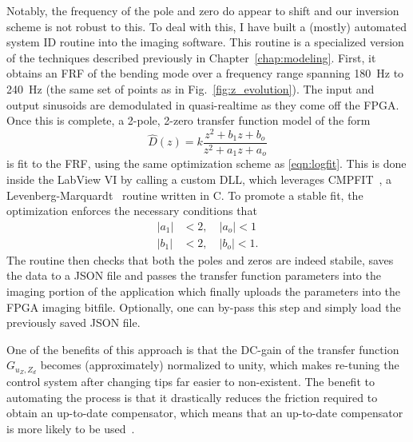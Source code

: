 \documentclass[twocolumn,twoside]{IEEEtran/IEEEtran}
\begin{document}
Notably, the frequency of the pole and zero do appear to shift and our inversion
scheme is not robust to this. To deal with this, I have built a (mostly)
automated system ID routine into the imaging software. This routine is a
specialized version of the techniques described previously in
Chapter~\ref{chap:modeling}. First, it obtains an FRF of the bending mode over a
frequency range spanning 180~Hz to 240~Hz (the same set of points as in
Fig.~\ref{fig:z_evolution}). The input and output sinusoids are demodulated in
quasi-realtime as they come off the FPGA. Once this is complete, a 2-pole,
2-zero transfer function model of the form
\begin{equation*}
  \hat{D}(z) = k \frac{z^2 + b_1z + b_o}{z^2 + a_1z + a_o}
\end{equation*}
is fit to the FRF, using the same optimization scheme as \eqref{eqn:logfit}.
This is done inside the LabView VI by calling a custom DLL, which leverages
CMPFIT~\cite{cmpfit,markwardt_mpfit_2009}, a
Levenberg-Marquardt~\cite{more_levenberg_1978} routine written in C. To promote
a stable fit, the optimization enforces the necessary conditions that
\begin{align*}
  |a_1| &< 2, \quad  |a_o| < 1\\
  |b_1| &< 2, \quad  |b_o| < 1.
\end{align*}
The routine then checks that both the poles and zeros are indeed stabile, saves
the data to a JSON file and passes the transfer function parameters into the
imaging portion of the application which finally uploads the parameters into the
FPGA imaging bitfile. Optionally, one can by-pass this step and simply load the
previously saved JSON file.

One of the benefits of this approach is that the DC-gain of the transfer
function $G_{u_Z,Z_d}$ becomes (approximately) normalized to unity, which makes
re-tuning the control system after changing tips far easier to non-existent. The
benefit to automating the process is that it drastically reduces the friction
required to obtain an up-to-date compensator, which means that an up-to-date
compensator is more likely to be used~\cite{abramovitch_25years_2015}.
\end{document}
